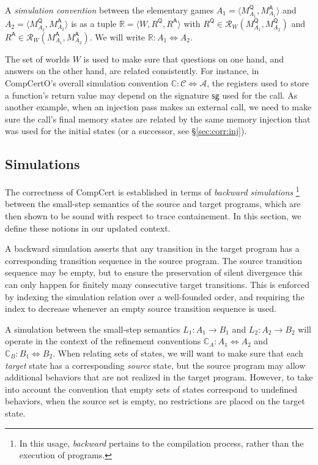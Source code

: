 \documentclass[sigplan,10pt,review,anonymous]{acmart}
\newcommand{\kw}[1]{\ensuremath{ \mathsf{#1} }}
\begin{document}
\begin{definition} %
A \emph{simulation convention} between the elementary games
$A_1 = \langle M_{A_1}^\kw{Q}, M_{A_1}^\kw{A} \rangle$ and
$A_2 = \langle M_{A_2}^\kw{Q}, M_{A_2}^\kw{A} \rangle$
is as a tuple $\mathbb{R} = \langle W, R^\kw{Q}, R^\kw{A} \rangle$
with $R^\kw{Q} \in \mathcal{R}_W(M_{A_1}^\kw{Q}, M_{A_2}^\kw{Q})$
and $R^\kw{A} \in \mathcal{R}_W(M_{A_1}^\kw{A}, M_{A_2}^\kw{A})$.
We will write $\mathbb{R} : A_1 \Leftrightarrow A_2$.
\end{definition}

The set of worlds $W$ is used to
make sure that questions on one hand,
and answers on the other hand,
are related consistently.
For instance,
in CompCertO's overall simulation convention
$\mathbb{C} : \mathcal{C} \Leftrightarrow \mathcal{A}$,
the registers used to store a function's return value
may depend on the signature $\kw{sg}$ used for the call.
As another example,
when an injection pass makes an external call,
we need to make sure the call's final memory states
are related by the same memory injection that was used
for the initial states (or a successor, see \S\ref{sec:corr:inj}).


\cbend

\subsection{Simulations} \label{sec:sem:simconv} %
\label{sec:modsem:ref}

The correctness of CompCert is established in terms of
\emph{backward simulations}%
\footnote{In this usage, \emph{backward} pertains to
  the compilation process,
  rather than the execution of programs.}
between the small-step semantics of the source and target programs,
which are then shown to be sound with respect to trace containement.
In this section,
we define these notions in our updated context.

A backward simulation asserts that any transition in the target program
has a corresponding transition sequence in the source program.
The source transition sequence may be empty,
but to ensure the preservation of silent divergence
this can only happen for finitely many consecutive target transitions.
This is enforced by indexing the simulation relation
over a well-founded order,
and requiring the index to decrease
whenever an empty source transition sequence is used.

A simulation between the small-step semantics
$L_1 : A_1 \rightarrow B_1$ and
$L_2 : A_2 \rightarrow B_2$ will
operate in the context of the refinement conventions
$\mathbb{C}_A : A_1 \Leftrightarrow A_2$ and
$\mathbb{C}_B : B_1 \Leftrightarrow B_2$.
When relating sets of states,
we will want to make sure that
each \emph{target} state has a corresponding \emph{source} state,
but the source program may allow additional behaviors
that are not realized in the target program.
However, to take into account the convention that
empty sets of states correspond to undefined behaviors,
when the source set is empty,
no restrictions are placed on the target state.
\end{document}
